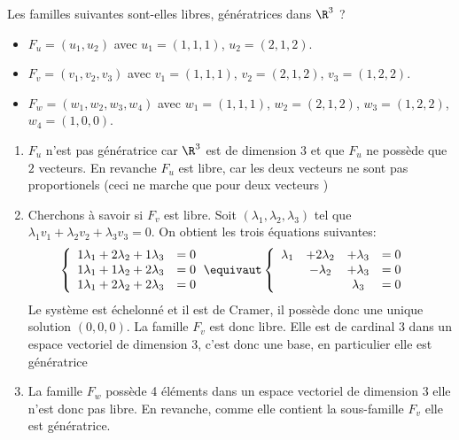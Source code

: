 



\begin{exercice}
Les familles suivantes sont-elles libres, génératrices dans $\R^3$ ?
\begin{itemize}
\item $F_u=(u_1,u_2) $ avec $u_1 = (1,1,1) $, $u_2=(2,1,2)$.
\item $F_v=(v_1,v_2, v_3) $ avec $v_1 = (1,1,1) $, $v_2=(2,1,2)$, $v_3=(1,2,2)$. 
\item $F_w=(w_1,w_2, w_3,w_4) $ avec $w_1 = (1,1,1) $, $w_2=(2,1,2)$, $w_3=(1,2,2)$, $w_4=(1,0,0)$. 
\end{itemize}
\end{exercice}
\vsec\vsec\vsec
\begin{correction}
\begin{enumerate}
\item $F_u$ n'est pas génératrice car $\R^3$ est de dimension $3$ et que $F_u$ ne possède que $2$ vecteurs. En revanche $F_u$ est libre, car les deux vecteurs ne sont pas proportionels (ceci ne marche que pour deux vecteurs )
\item Cherchons à savoir si $F_v$ est libre. 
Soit $(\lambda_1, \lambda_2, \lambda_3) $ tel que $\lambda_1 v_1 +\lambda_2 v_2 +\lambda_3 v_3 =0$. 
On obtient les trois équations suivantes:
\begin{align*}
\left\{ 
\begin{array}{cc}
1\lambda_1 +2\lambda_2 +1\lambda_3 &=0\\
1\lambda_1 +1\lambda_2 +2\lambda_3 &=0\\
1\lambda_1 +2\lambda_2 +2\lambda_3 &=0
\end{array}\right. & \equivaut 
\left\{ 
\begin{array}{cccc}
\lambda_1 &+2\lambda_2 &+\lambda_3 &=0\\
 &-\lambda_2 &+\lambda_3 &=0\\
&&\lambda_3 &=0
\end{array}\right. 
\end{align*}
Le système est échelonné et il est de Cramer, il possède donc une unique solution $(0,0,0)$. La famille $F_v$ est donc libre. 
Elle est de cardinal 3 dans un espace vectoriel de dimension 3, c'est donc une base, en particulier elle est génératrice 
\item La famille $F_w$ possède 4 éléments dans un espace vectoriel de dimension $3$ elle n'est donc pas libre. En revanche, comme elle contient la sous-famille $F_v$ elle est génératrice. 

\end{enumerate}
\end{correction}